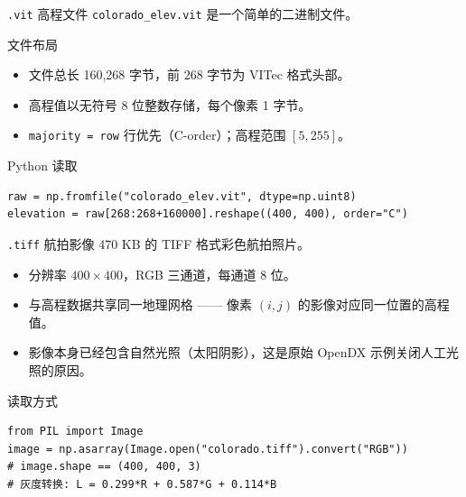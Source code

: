\documentclass[aspectratio=169,11pt]{ctexbeamer}
\begin{document}
\begin{frame}[fragile]{\texttt{.vit} 高程文件}
  \texttt{colorado\_elev.vit} 是一个简单的二进制文件。

  \begin{block}{文件布局}
    \begin{center}
    \end{center}
  \end{block}

  \begin{itemize}
    \item 文件总长 160,268 字节，前 268 字节为 VITec 格式头部。
    \item 高程值以无符号 8 位整数存储，每个像素 1 字节。
    \item \texttt{majority = row} 行优先（C-order）；高程范围 $[5, 255]$。
  \end{itemize}

  \begin{block}{Python 读取}
\begin{Verbatim}[fontsize=\tiny]
raw = np.fromfile("colorado_elev.vit", dtype=np.uint8)
elevation = raw[268:268+160000].reshape((400, 400), order="C")
\end{Verbatim}
  \end{block}
\end{frame}

\begin{frame}[fragile]{\texttt{.tiff} 航拍影像}
  470 KB 的 TIFF 格式彩色航拍照片。

  \begin{itemize}
    \item 分辨率 $400\times400$，RGB 三通道，每通道 8 位。
    \item 与高程数据共享同一地理网格 —— 像素 $(i,j)$ 的影像对应同一位置的高程值。
    \item 影像本身已经包含自然光照（太阳阴影），这是原始 OpenDX 示例关闭人工光照的原因。
  \end{itemize}

  \begin{block}{读取方式}
\begin{Verbatim}[fontsize=\scriptsize]
from PIL import Image
image = np.asarray(Image.open("colorado.tiff").convert("RGB"))
# image.shape == (400, 400, 3)
# 灰度转换: L = 0.299*R + 0.587*G + 0.114*B
\end{Verbatim}
  \end{block}
\end{frame}
\end{document}
